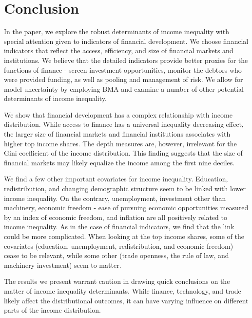 \documentclass[preprint, nonatbib, 10pt]{elsarticle}
\begin{document}
%
%
%
%
%

\section{Conclusion}
\label{sec:conclusion}
In the paper, we explore the robust determinants of income inequality with special attention given to indicators of financial development. We choose financial indicators that reflect the access, efficiency, and size of financial markets and institutions. We believe that the detailed indicators provide better proxies for the functions of finance - screen investment opportunities, monitor the debtors who were provided funding, as well as pooling and management of risk. We allow for model uncertainty by employing \ac{BMA} and examine a number of other potential determinants of income inequality. 

We show that financial development has a complex relationship with income distribution. While access to finance has a universal inequality decreasing effect, the larger size of financial markets and financial institutions associates with higher top income shares. The depth measures are, however, irrelevant for the Gini coefficient of the income distribution. This finding suggests that the size of financial markets may likely equalize the income among the first nine deciles. 

We find a few other important covariates for income inequality. Education, redistribution, and changing demographic structure seem to be linked with lower income inequality. On the contrary, unemployment, investment other than machinery, economic freedom - ease of pursuing economic opportunities measured by an index of economic freedom, and inflation are all positively related to income inequality. As in the case of financial indicators, we find that the link could be more complicated. When looking at the top income shares, some of the covariates (education, unemployment, redistribution, and economic freedom) cease to be relevant, while some other (trade openness, the rule of law, and machinery investment) seem to matter.

The results we present warrant caution in drawing quick conclusions on the matter of income inequality determinants. While finance, technology, and trade likely affect the distributional outcomes, it can have varying influence on different parts of the income distribution.

\clearpage
%
%
%
%
%
%
%
%
%
%
\newpage
\printbibliography
\clearpage
%
%
%
%
%
\appendix
\renewcommand{\thesection}{A\arabic{section}}%
\renewcommand{\thetable}{A\arabic{table}}%
\renewcommand{\thefigure}{A\arabic{figure}}%
\renewcommand{\theequation}{A\arabic{equation}}%
\setcounter{equation}{0}%
\setcounter{table}{0}%
\setcounter{figure}{0}%
\end{document}
